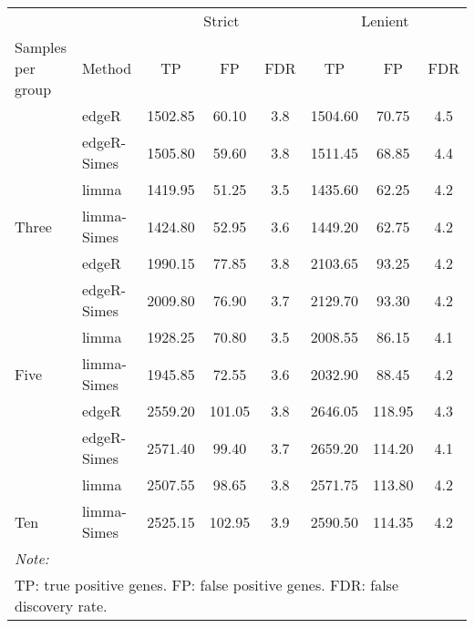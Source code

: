 
\begin{tabular}[t]{llcccccc}
\toprule
\multicolumn{2}{c}{ } & \multicolumn{3}{c}{Strict} & \multicolumn{3}{c}{Lenient} \\
\cmidrule(l{3pt}r{3pt}){3-5} \cmidrule(l{3pt}r{3pt}){6-8}
\makecell[l]{Samples per\\group} & Method & TP & FP & FDR & TP & FP & FDR\\
\midrule
 & edgeR & 1502.85 & 60.10 & 3.8 & 1504.60 & 70.75 & 4.5\\

 & edgeR-Simes & 1505.80 & 59.60 & 3.8 & 1511.45 & 68.85 & 4.4\\

 & limma & 1419.95 & 51.25 & 3.5 & 1435.60 & 62.25 & 4.2\\

\multirow{-4}{*}{\raggedright\arraybackslash Three} & limma-Simes & 1424.80 & 52.95 & 3.6 & 1449.20 & 62.75 & 4.2\\
\cmidrule{1-8}
 & edgeR & 1990.15 & 77.85 & 3.8 & 2103.65 & 93.25 & 4.2\\

 & edgeR-Simes & 2009.80 & 76.90 & 3.7 & 2129.70 & 93.30 & 4.2\\

 & limma & 1928.25 & 70.80 & 3.5 & 2008.55 & 86.15 & 4.1\\

\multirow{-4}{*}{\raggedright\arraybackslash Five} & limma-Simes & 1945.85 & 72.55 & 3.6 & 2032.90 & 88.45 & 4.2\\
\cmidrule{1-8}
 & edgeR & 2559.20 & 101.05 & 3.8 & 2646.05 & 118.95 & 4.3\\

 & edgeR-Simes & 2571.40 & 99.40 & 3.7 & 2659.20 & 114.20 & 4.1\\

 & limma & 2507.55 & 98.65 & 3.8 & 2571.75 & 113.80 & 4.2\\

\multirow{-4}{*}{\raggedright\arraybackslash Ten} & limma-Simes & 2525.15 & 102.95 & 3.9 & 2590.50 & 114.35 & 4.2\\
\bottomrule
\multicolumn{8}{l}{\rule{0pt}{1em}\textit{Note: }}\\
\multicolumn{8}{l}{\rule{0pt}{1em}TP: true positive genes. FP: false positive genes. FDR: false discovery rate.}\\
\end{tabular}
